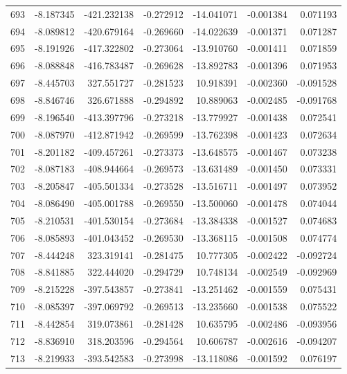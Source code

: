 \begin{tabular}{rrrrrrr}
 693 &  -8.187345 & -421.232138 & -0.272912 & -14.041071 &  -0.001384 &  0.071193 \\
 694 &  -8.089812 & -420.679164 & -0.269660 & -14.022639 &  -0.001371 &  0.071287 \\
 695 &  -8.191926 & -417.322802 & -0.273064 & -13.910760 &  -0.001411 &  0.071859 \\
 696 &  -8.088848 & -416.783487 & -0.269628 & -13.892783 &  -0.001396 &  0.071953 \\
 697 &  -8.445703 &  327.551727 & -0.281523 &  10.918391 &  -0.002360 & -0.091528 \\
 698 &  -8.846746 &  326.671888 & -0.294892 &  10.889063 &  -0.002485 & -0.091768 \\
 699 &  -8.196540 & -413.397796 & -0.273218 & -13.779927 &  -0.001438 &  0.072541 \\
 700 &  -8.087970 & -412.871942 & -0.269599 & -13.762398 &  -0.001423 &  0.072634 \\
 701 &  -8.201182 & -409.457261 & -0.273373 & -13.648575 &  -0.001467 &  0.073238 \\
 702 &  -8.087183 & -408.944664 & -0.269573 & -13.631489 &  -0.001450 &  0.073331 \\
 703 &  -8.205847 & -405.501334 & -0.273528 & -13.516711 &  -0.001497 &  0.073952 \\
 704 &  -8.086490 & -405.001788 & -0.269550 & -13.500060 &  -0.001478 &  0.074044 \\
 705 &  -8.210531 & -401.530154 & -0.273684 & -13.384338 &  -0.001527 &  0.074683 \\
 706 &  -8.085893 & -401.043452 & -0.269530 & -13.368115 &  -0.001508 &  0.074774 \\
 707 &  -8.444248 &  323.319141 & -0.281475 &  10.777305 &  -0.002422 & -0.092724 \\
 708 &  -8.841885 &  322.444020 & -0.294729 &  10.748134 &  -0.002549 & -0.092969 \\
 709 &  -8.215228 & -397.543857 & -0.273841 & -13.251462 &  -0.001559 &  0.075431 \\
 710 &  -8.085397 & -397.069792 & -0.269513 & -13.235660 &  -0.001538 &  0.075522 \\
 711 &  -8.442854 &  319.073861 & -0.281428 &  10.635795 &  -0.002486 & -0.093956 \\
 712 &  -8.836910 &  318.203596 & -0.294564 &  10.606787 &  -0.002616 & -0.094207 \\
 713 &  -8.219933 & -393.542583 & -0.273998 & -13.118086 &  -0.001592 &  0.076197 \\

\end{tabular}
